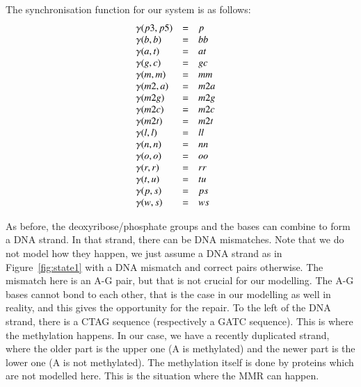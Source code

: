 \documentclass[review]{elsarticle}
\begin{document}
The synchronisation function for our system is as follows:
%
$$\begin{array}{ l c l l }
\gamma(p3,p5) & = & p & \\
\gamma(b,b) & = & bb &\\
\gamma(a,t) & = & at &  \\
\gamma(g,c) & = & gc & \\
\gamma(m,m) & = & mm & \\
\gamma(m2,a) & = & m2a & \\
\gamma(m2g) & = & m2g & \\
\gamma(m2c) & = & m2c & \\
\gamma(m2t) & = & m2t & \\
\gamma(l,l) & = & ll & \\
\gamma(n,n) & = & nn & \\
\gamma(o,o) & = & oo & \\
\gamma(r,r) & = & rr & \\
\gamma(t,u) & = & tu & \\
\gamma(p,s) & = & ps & \\
\gamma(w,s) & = & ws & \\
\end{array}$$

As before, the deoxyribose/phosphate groups and the bases can combine to form a DNA strand. In that strand, there can be DNA mismatches. Note that we do not model how they happen, we just assume a DNA strand as in Figure~\ref{fig:state1} with a DNA mismatch and correct pairs otherwise. The mismatch here is an A-G pair, but that is not crucial for our modelling. The A-G bases cannot bond to each other, that is the case in our modelling as well in reality, and this gives the opportunity for the repair. To the left of the DNA strand, there is a CTAG sequence (respectively a GATC sequence). This is where the methylation happens. In our case, we have a recently duplicated strand, where the older part is the upper one (A is methylated) and the newer part is the lower one (A is not methylated). The methylation itself is done by proteins which are not modelled here. This is the situation where the MMR can happen.
\end{document}
